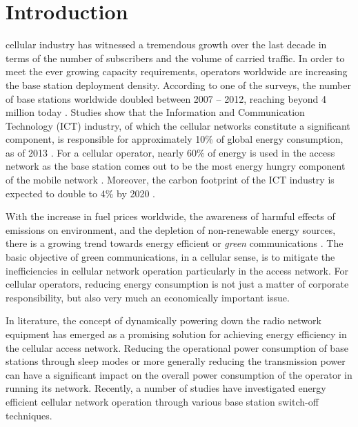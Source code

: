 \documentclass[journal]{IEEEtran}
\begin{document}
\IEEEpeerreviewmaketitle



\section{Introduction}
 cellular industry has witnessed a tremendous growth over the last decade in terms of the number of subscribers and the volume of carried traffic. In order to meet the ever growing capacity requirements, operators worldwide are increasing the base station deployment density. According to one of the surveys, the number of base stations worldwide doubled between 2007 -- 2012, reaching beyond 4 million today \cite{ee_bs_sleep}.  Studies show that the Information and Communication Technology (ICT) industry, of which the cellular networks constitute a significant component, is responsible for approximately 10\% of global energy consumption, as of 2013 \cite{EC_energy}. For a cellular operator, nearly 60\% of energy is used in the access network as the base station comes out to be the most energy hungry component of the mobile network \cite{gr_commag}. Moreover, the carbon footprint of the ICT industry is expected to double to 4\% by 2020 \cite{carbon_ICT,ee_bs_sleep}.




With the increase in fuel prices worldwide, the awareness of harmful effects of  emissions on environment, and the depletion of non-renewable energy sources, there is a growing trend towards energy efficient or \emph{green} communications \cite{GC_CRC}. The basic objective of green communications, in a cellular sense, is to mitigate the inefficiencies in cellular network operation particularly in the access network. For cellular operators, reducing energy consumption is not just a matter of corporate responsibility, but also very much an economically important issue. 




In literature, the concept of dynamically powering down the radio network equipment has emerged as a promising solution for achieving energy efficiency in the cellular access network. Reducing the operational power consumption of base stations through sleep modes or more generally reducing the transmission power can have a significant impact on the overall power consumption of the operator in running its network. Recently, a number of studies have investigated energy efficient cellular network operation through various base station switch-off techniques. 
\end{document}
